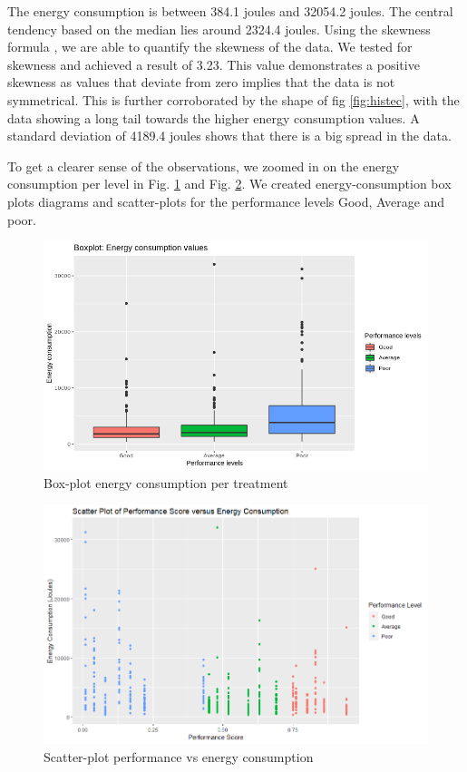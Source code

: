 The energy consumption is between 384.1 joules and 32054.2 joules. The central tendency based on the median lies around 2324.4 joules. Using the skewness formula \cite{Rep:e1071}, we are able to quantify the skewness of the data. We tested for skewness and achieved a result of 3.23. This value demonstrates a positive skewness as values that deviate from zero implies that the data is not symmetrical. This is further corroborated by the shape of fig \ref{fig:histec}, with the data showing a long tail towards the higher energy consumption values. A standard deviation of 4189.4 joules shows that there is a big spread in the data.  

To get a clearer sense of the observations, we zoomed in on the energy consumption per level in Fig. \ref{fig:boxecv} and Fig. \ref{fig:scatpvsec}. We created energy-consumption box plots diagrams and scatter-plots for the performance levels Good, Average and poor.

\begin{figure}[H]
  \includegraphics[width=\linewidth]{./Images/boxplot-ecv.jpg}
  \caption{Box-plot energy consumption per treatment}
  \label{fig:boxecv}
\end{figure}

\begin{figure}[H]
  \includegraphics[width=\linewidth]{./Images/ScatterPlot_PerfScore_v_EnergyConsumption.png}
  \caption{Scatter-plot performance vs energy consumption}
  \label{fig:scatpvsec}
\end{figure}

